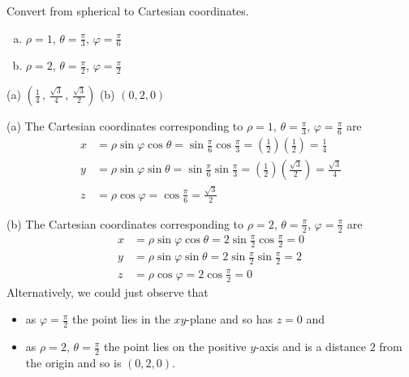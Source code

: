 \begin{question}
Convert from spherical to Cartesian coordinates.
\begin{enumerate}[(a)]
\item $\rho=1$, $\theta=\frac{\pi}{3}$, $\varphi=\frac{\pi}{6}$
\item $\rho=2$, $\theta=\frac{\pi}{2}$, $\varphi=\frac{\pi}{2}$
\end{enumerate}

\end{question}

%

\begin{answer}
(a) $\left(\frac{1}{4}\,,\,\frac{\sqrt{3}}{4}\,,\,\frac{\sqrt{3}}{2}\right)$
\qquad
(b) $(0,2,0)$

\end{answer}

\begin{solution}
(a) The Cartesian coordinates corresponding to 
$\rho=1$, $\theta=\frac{\pi}{3}$, $\varphi=\frac{\pi}{6}$ are
\begin{align*}
x&=\rho\sin\varphi\cos\theta
  =\sin\frac{\pi}{6}\cos\frac{\pi}{3}
  =\left(\frac{1}{2}\right)\left(\frac{1}{2}\right)
  =\frac{1}{4}
\\
y&=\rho\sin\varphi\sin\theta
  =\sin\frac{\pi}{6}\sin\frac{\pi}{3}
  =\left(\frac{1}{2}\right)\left(\frac{\sqrt{3}}{2}\right)
  =\frac{\sqrt{3}}{4}
\\
z&=\rho\cos\varphi
  =\cos\frac{\pi}{6}
  =\frac{\sqrt{3}}{2}
\end{align*}

(b) The Cartesian coordinates corresponding to 
$\rho=2$, $\theta=\frac{\pi}{2}$, $\varphi=\frac{\pi}{2}$ are
\begin{align*}
x&=\rho\sin\varphi\cos\theta
  =2\sin\frac{\pi}{2}\cos\frac{\pi}{2}
  =0
\\
y&=\rho\sin\varphi\sin\theta
  =2\sin\frac{\pi}{2}\sin\frac{\pi}{2}
  =2
\\
z&=\rho\cos\varphi
  =2\cos\frac{\pi}{2}
  =0
\end{align*}
Alternatively, we could just observe that
\begin{itemize}
\item
as $\varphi=\frac{\pi}{2}$ the point lies in the $xy$-plane
and so has $z=0$ and
\item
as $\rho=2$, $\theta=\frac{\pi}{2}$ the point lies on the positive $y$-axis
and is a distance $2$ from the origin and so is $(0,2,0)$. 
\end{itemize}

\end{solution}

